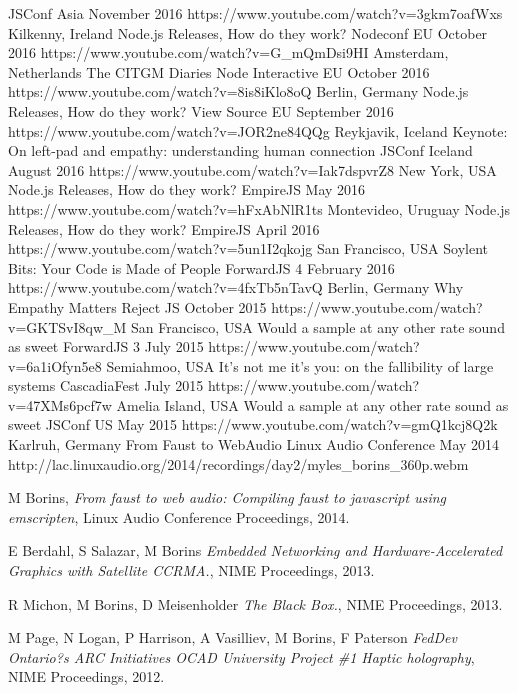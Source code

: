 \documentclass[10pt,a4paper,sans]{moderncv}   %
\begin{document}
   {JSConf Asia}
   {November 2016}{}
   {https://www.youtube.com/watch?v=3gkm7oafWxs}
 \cventry
   {Kilkenny, Ireland}
   {Node.js Releases, How do they work?}
   {Nodeconf EU}
   {October 2016}{}
   {https://www.youtube.com/watch?v=G\_mQmDsi9HI}
 \cventry
   {Amsterdam, Netherlands}
   {The CITGM Diaries}
   {Node Interactive EU}
   {October 2016}{}
   {https://www.youtube.com/watch?v=8is8iKlo8oQ}
 \cventry
   {Berlin, Germany}
   {Node.js Releases, How do they work?}
   {View Source EU}
   {September 2016}{}
   {https://www.youtube.com/watch?v=JOR2ne84QQg}
 \cventry
   {Reykjavik, Iceland}
   {Keynote:  On left-pad and empathy: understanding human connection}
   {JSConf Iceland}
   {August 2016}{}
   {https://www.youtube.com/watch?v=Iak7dspvrZ8}
 \cventry
   {New York, USA}
   {Node.js Releases, How do they work?}
   {EmpireJS}
   {May 2016}{}
   {https://www.youtube.com/watch?v=hFxAbNlR1ts}
 \cventry
   {Montevideo, Uruguay}
   {Node.js Releases, How do they work?}
   {EmpireJS}
   {April 2016}{}
   {https://www.youtube.com/watch?v=5un1I2qkojg}
 \cventry
   {San Francisco, USA}
   {Soylent Bits: Your Code is Made of People}
   {ForwardJS 4}
   {February 2016}{}
   {https://www.youtube.com/watch?v=4fxTb5nTavQ}
 \cventry
   {Berlin, Germany}
   {Why Empathy Matters}
   {Reject JS}
   {October 2015}{}
   {https://www.youtube.com/watch?v=GKTSvI8qw\_M}
 \cventry
   {San Francisco, USA}
   {Would a sample at any other rate sound as sweet}
   {ForwardJS 3}
   {July 2015}{}
   {https://www.youtube.com/watch?v=6a1iOfyn5e8}
 \cventry
   {Semiahmoo, USA}
   {It's not me it's you: on the fallibility of large systems}
   {CascadiaFest}
   {July 2015}{}
   {https://www.youtube.com/watch?v=47XMs6pcf7w}
 \cventry
   {Amelia Island, USA}
   {Would a sample at any other rate sound as sweet}
   {JSConf US}
   {May 2015}{}
   {https://www.youtube.com/watch?v=gmQ1kcj8Q2k}
 \cventry
   {Karlruh, Germany}
   {From Faust to WebAudio}
   {Linux Audio Conference}
   {May 2014}{}
   {http://lac.linuxaudio.org/2014/recordings/day2/myles\_borins\_360p.webm}

 \begin{thebibliography}{9}

   M Borins,
   \textit{From faust to web audio: Compiling faust to javascript using emscripten},
   Linux Audio Conference Proceedings,
   2014.

   E Berdahl, S Salazar, M Borins
   \textit{Embedded Networking and Hardware-Accelerated Graphics with Satellite CCRMA.},
   NIME Proceedings,
   2013.

   R Michon, M Borins, D Meisenholder
   \textit{The Black Box.},
   NIME Proceedings,
   2013.

   M Page, N Logan, P Harrison, A Vasilliev, M Borins, F Paterson
   \textit{FedDev Ontario?s ARC Initiatives OCAD University Project \#1 Haptic holography},
   NIME Proceedings,
   2012.

 \end{thebibliography}
\end{document}
